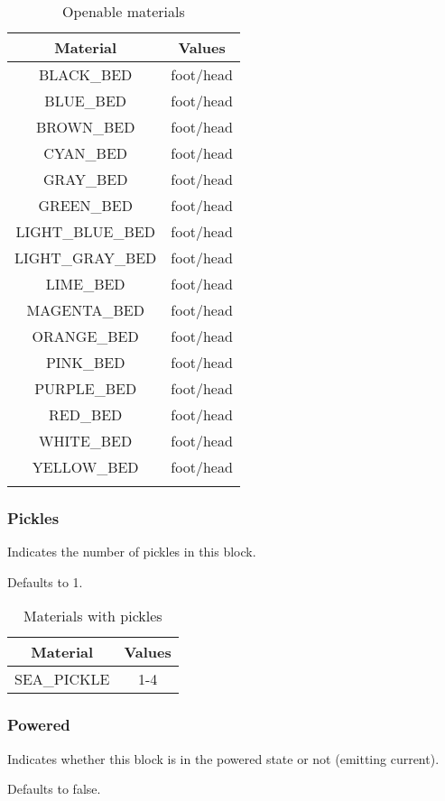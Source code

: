 \begin{longtable}{ |c|c| }
	\hline
	Material & Values \\
	\hline
	\endhead
	BLACK\_BED & foot/head \\
	BLUE\_BED & foot/head \\
	BROWN\_BED & foot/head \\
	CYAN\_BED & foot/head \\
	GRAY\_BED & foot/head \\
	GREEN\_BED & foot/head \\
	LIGHT\_BLUE\_BED & foot/head \\
	LIGHT\_GRAY\_BED & foot/head \\
	LIME\_BED & foot/head \\
	MAGENTA\_BED & foot/head \\
	ORANGE\_BED & foot/head \\
	PINK\_BED & foot/head \\
	PURPLE\_BED & foot/head \\
	RED\_BED & foot/head \\
	WHITE\_BED & foot/head \\
	YELLOW\_BED & foot/head \\
	\hline
	\caption{Openable materials}
\end{longtable}

\subsubsection{Pickles}
Indicates the number of pickles in this block.

Defaults to 1.

\begin{table}[H]
	\centering
	\begin{tabular}{ |c|c| }
		\hline
		Material & Values \\
		\hline
		SEA\_PICKLE & 1-4 \\
		\hline
	\end{tabular}
	\caption{Materials with pickles}
\end{table}


\subsubsection{Powered}\label{spigot-types:powered}
Indicates whether this block is in the powered state or not (emitting current).

Defaults to false.

